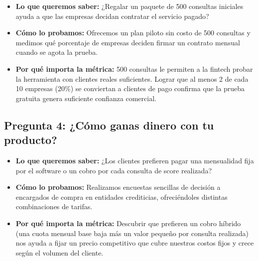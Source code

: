 \documentclass[11pt,a4paper]{article}
\begin{document}
\begin{tcolorbox}[colback=lightgray,colframe=secondary,title=\textbf{Experimento 3.2: Prueba de versión gratuita inicial (Freemium Pilot)}]
\begin{itemize}[leftmargin=*]
    \item \textbf{Lo que queremos saber:} ¿Regalar un paquete de 500 consultas iniciales ayuda a que las empresas decidan contratar el servicio pagado?
    \item \textbf{Cómo lo probamos:} Ofrecemos un plan piloto sin costo de 500 consultas y medimos qué porcentaje de empresas deciden firmar un contrato mensual cuando se agota la prueba.
    \item \textbf{Por qué importa la métrica:} 500 consultas le permiten a la fintech probar la herramienta con clientes reales suficientes. Lograr que al menos 2 de cada 10 empresas (20\%) se conviertan a clientes de pago confirma que la prueba gratuita genera suficiente confianza comercial.
\end{itemize}
\end{tcolorbox}

\subsection{Pregunta 4: ¿Cómo ganas dinero con tu producto?}

\begin{tcolorbox}[colback=lightgray,colframe=secondary,title=\textbf{Experimento 4.1: Encuesta de preferencia de modelo de cobro}]
\begin{itemize}[leftmargin=*]
    \item \textbf{Lo que queremos saber:} ¿Los clientes prefieren pagar una mensualidad fija por el software o un cobro por cada consulta de score realizada?
    \item \textbf{Cómo lo probamos:} Realizamos encuestas sencillas de decisión a encargados de compra en entidades crediticias, ofreciéndoles distintas combinaciones de tarifas.
    \item \textbf{Por qué importa la métrica:} Descubrir que prefieren un cobro híbrido (una cuota mensual base baja más un valor pequeño por consulta realizada) nos ayuda a fijar un precio competitivo que cubre nuestros costos fijos y crece según el volumen del cliente.
\end{itemize}
\end{tcolorbox}
\end{document}
